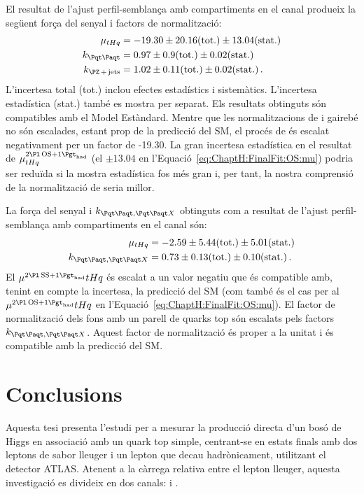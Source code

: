 El resultat de l'ajust perfil-semblança amb compartiments en el canal \dilepOStau produeix la següent força del senyal i factors de normalització:
\begin{align}
\mu_{\tHq} &= -19.30 \pm 20.16 (\text{tot.}) \pm 13.04 (\text{stat.}) \label{eq:resum:FinalFit:OS:mu} \\
k_{\ttbar} &= 0.97 \pm 0.9 (\text{tot.}) \pm 0.02 (\text{stat.}) \label{eq:resum:FinalFit:OS:ktt}\\
k_{\Zjets} &= 1.02 \pm 0.11 (\text{tot.}) \pm 0.02 (\text{stat.}) \label{eq:resum:FinalFit:OS:zjets}\, .
\end{align}
L'incertesa total (tot.) inclou efectes estadístics i sistemàtics. L'incertesa estadística (stat.) també es mostra per separat. Els resultats obtinguts són compatibles amb el Model Estàndard. Mentre que les normalitzacions de \ttbar i \Zjets gairebé no són escalades, estant prop de la predicció del SM, el procés de \tHq és escalat negativament per un factor de -19.30. La gran incertesa estadística en el resultat de $\mu^{\dilepOStau}_{\tHq}$ (el $\pm 13.04$ en l'Equació~\ref{eq:ChaptH:FinalFit:OS:mu}) podria ser reduïda si la mostra estadística fos més gran i, per tant, la nostra comprensió de la normalització de \tHq seria millor.

La força del senyal i $k_{\ttbar,\ttX}$ obtinguts com a resultat de l'ajust perfil-semblança amb compartiments en el canal \dilepSStau són:
\begin{align}
\mu_{\tHq} &= -2.59 \pm 5.44 (\text{tot.}) \pm 5.01 (\text{stat.}) \label{eq:resum:FinalFit:SS:mu} \\
k_{\ttbar,\ttX} &= 0.73 \pm 0.13 (\text{tot.}) \pm 0.10 (\text{stat.}) \label{eq:resum:FinalFit:SS:ktt} \, .\
\end{align}
El $\mu^{\dilepSStau}{\tHq}$ és escalat a un valor negatiu que és compatible amb, tenint en compte la incertesa, la predicció del SM (com també és el cas per al $\mu^{\dilepOStau}{\tHq}$ en l'Equació~\ref{eq:ChaptH:FinalFit:OS:mu}). El factor de normalització dels fons amb un parell de quarks top són escalats pels factors $k_{\ttbar,\ttX}$. Aquest factor de normalització és proper a la unitat i és compatible amb la predicció del SM.







\FloatBarrier
\section{Conclusions}
Aquesta tesi presenta l'estudi per a mesurar la producció directa d'un bosó de Higgs en associació amb un quark top simple, centrant-se en estats finals amb dos leptons de sabor lleuger i un lepton \Ptau que decau hadrònicament, utilitzant el detector ATLAS. Atenent a la càrrega relativa entre el lepton lleuger, aquesta investigació es divideix en dos canals: \dilepOStau i \dilepSStau.


